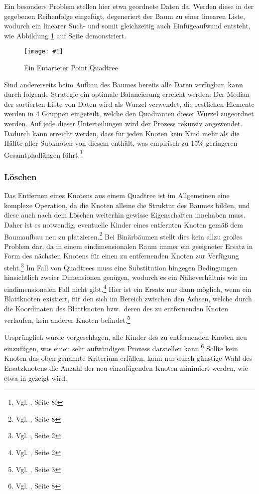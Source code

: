 \documentclass[%
			fontsize=12pt,%
			paper=a4,%
			DIV11,
			liststotoc,
			bibtotoc,
			draft=false,%
			titlepage
			]{scrartcl}
\newcommand{\zit}[3]{#1 \cite{#2}, #3}
\newcommand{\footzit}[3]{\footnote{\zit{#1}{#2}{#3}}}
\newcommand{\myfig}[5] {
 \begin{figure}[tbph]
	 \centering
	 \texttt{[image: \#1]}
	 \caption[#4]{#5}
	 \label{fig:#2}
 \end{figure}
}
\begin{document}
Ein besonders Problem stellen hier etwa geordnete Daten da. Werden diese in der gegebenen Reihenfolge eingefügt, degeneriert der Baum zu einer linearen Liste, wodurch ein linearer Such- und somit gleichzeitig auch Einfügeaufwand entsteht, wie Abbildung \ref{fig:entartung} auf Seite \pageref{fig:entartung} demonstriert.
\myfig{img/pointquadtree-entartet-trimmed}{entartung}{width=.6\textwidth}{Entarteter Point Quadtree}{Ein Entarteter Point Quadtree}

Sind andererseits beim Aufbau des Baumes bereits alle Daten verfügbar, kann durch folgende Strategie ein optimale Balancierung erreicht werden: Der Median der sortierten Liste von Daten wird als Wurzel verwendet, die restlichen Elemente werden in 4 Gruppen eingeteilt, welche den Quadranten dieser Wurzel zugeordnet werden.
Auf jede dieser Unterteilungen wird der Prozess rekursiv angewendet. Dadurch kann erreicht werden, dass für jeden Knoten kein Kind mehr als die Hälfte aller Subknoten von diesem enthält, was empirisch zu 15\% geringeren Gesamtpfadlängen führt.\footzit{Vgl.}{DBLP:journals/acta/FinkelB74}{Seite 8f}


\subsubsection{Löschen}
\label{sec:pointquadtree:delete}
Das Entfernen eines Knotens aus einem Quadtree ist im Allgemeinen eine komplexe Operation, da die Knoten alleine die Struktur des Baumes bilden, und diese auch nach dem Löschen weiterhin gewisse Eigenschaften innehaben muss.
Daher ist es notwendig, eventuelle Kinder eines entfernten Knoten gemäß dem Baumaufbau neu zu platzieren.\footzit{Vgl.}{DBLP:journals/acta/FinkelB74}{Seite 8}
Bei Binärbäumen stellt dies kein allzu großes Problem dar, da in einem eindimensionalen Raum immer ein geeigneter Ersatz in Form des nächsten Knotens für einen zu entfernenden Knoten zur Verfügung steht.\footzit{Vgl.}{DBLP:journals/cacm/Samet80a}{Seite 2}
Im Fall von Quadtrees muss eine Substitution hingegen Bedingungen hinsichtlich zweier Dimensionen genügen, wodurch es ein Näheverhältnis wie im eindimensionalen Fall nicht gibt.\footzit{Vgl.}{DBLP:journals/cacm/Samet80a}{Seite 2}
Hier ist ein Ersatz nur dann möglich, wenn ein Blattknoten existiert, für den sich im Bereich zwischen den Achsen, welche durch die Koordinaten des Blattknoten bzw.\ deren des zu entfernenden Knoten verlaufen, kein anderer Knoten befindet.\footzit{Vgl.}{DBLP:journals/cacm/Samet80a}{Seite 3}

Ursprünglich wurde vorgeschlagen, alle Kinder des zu entfernenden Knoten neu einzufügen, was einen sehr aufwändigen Prozess darstellen kann.\footzit{Vgl.}{DBLP:journals/acta/FinkelB74}{Seite 8}
Sollte kein Knoten das oben genannte Kriterium erfüllen, kann nur durch günstige Wahl des Ersatzknotens die Anzahl der neu einzufügenden Knoten minimiert werden, wie etwa in \cite{DBLP:journals/cacm/Samet80a} gezeigt wird.
\end{document}
